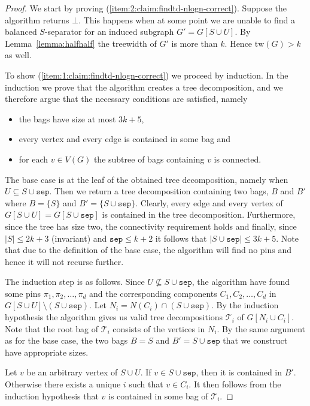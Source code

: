 \documentclass[a4paper,11pt]{article}
\theoremstyle{definition}
\theoremstyle{remark}
\newcommand{\sep}{\mathtt{sep}}
\newcommand{\false}{\bot}
\newcommand{\td}{\mathcal{T}} \newcommand{\tw}{\mathrm{tw}} \newcommand{\w}{\mathrm{w}}
\begin{document}
\begin{proof}
  We start by proving (\ref{item:2:claim:findtd-nlogn-correct}).
  Suppose the algorithm returns $\false$.  This happens when at some
  point we are unable to find a balanced $S$-separator for an induced
  subgraph $G' = G[S \cup U]$.  By Lemma~\ref{lemma:halfhalf} the
  treewidth of $G'$ is more than $k$.  Hence $\tw(G) > k$ as well.
  
  To show (\ref{item:1:claim:findtd-nlogn-correct}) we proceed by
  induction.  In the induction we prove that the algorithm creates a
  tree decomposition, and we therefore argue that the necessary
  conditions are satisfied, namely
  \begin{itemize}
  \item the bags have size at most $3k+5$,
  \item every vertex and every edge is contained in some bag and
  \item for each $v \in V(G)$ the subtree of bags containing $v$ is
    connected.
  \end{itemize}
  The base case is at the leaf of the obtained tree decomposition,
  namely when $U \subseteq S \cup \sep$.  Then we return a tree
  decomposition containing two bags, $B$ and $B'$ where $B = \{S\}$
  and $B' = \{S \cup \sep\}$.  Clearly, every edge and every vertex of
  $G[S \cup U] = G[S \cup \sep]$ is contained in the tree
  decomposition.  Furthermore, since the tree has size two, the
  connectivity requirement holds and finally, since $|S| \leq 2k+3$
  (invariant) and $\sep \leq k+2$ it follows that $|S \cup \sep | \leq
  3k+5$.  Note that due to the definition of the base case, the
  algorithm will find no pins and hence it will not recurse further.
  
The induction step is as follows.  Since $U \nsubseteq S \cup \sep$,
  the algorithm have found some pins $\pi_1, \pi_2, \dots, \pi_d$ and
  the corresponding components $C_1, C_2, \dots, C_d$ in $G[S \cup
  U]\setminus (S\cup \sep)$.  Let $N_i = N(C_i) \cap (S \cup \sep)$.
  By the induction hypothesis the algorithm gives us valid tree
  decompositions $\td_i$ of $G[N_i \cup C_i]$.  Note that the root bag
  of $\td_i$ consists of the vertices in $N_i$.  By the same argument
  as for the base case, the two bags $B = S$ and $B' = S \cup \sep$
  that we construct have appropriate sizes.


  Let $v$ be an arbitrary vertex of $S \cup U$.  If $v \in S \cup \sep$, then
  it is contained in $B'$.  Otherwise there exists a unique $i$ such
  that $v \in C_i$.  It then follows from the induction hypothesis
  that $v$ is contained in some bag of $\td_i$.
  

\end{proof}
\end{document}
